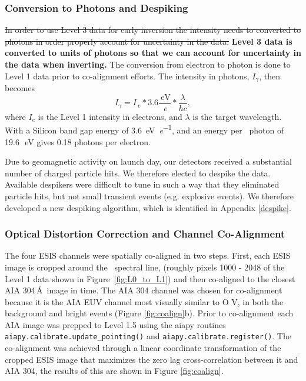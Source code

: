     
\subsubsection{Conversion to Photons and Despiking}
\sout{In order to use Level 3 data for early inversion the intensity needs to  converted to photons in order properly account for uncertainty in the data.}
\textbf{Level 3 data is converted to units of photons so that we can account for uncertainty in the data when inverting.}
The conversion from electron to photon is done to Level 1 data prior to co-alignment efforts.
The intensity in photons, $I_{\gamma}$, then becomes
\begin{equation}
  I_{\gamma} = I_{\SI{}{\elementarycharge}} * 3.6 \frac{\SI{}{\electronvolt}}{\SI{}{\elementarycharge}} * \frac{\lambda}{hc},
\end{equation}
where $I_e$ is the Level 1 intensity in electrons, and $\lambda$ is the target wavelength.
With a Silicon band gap energy of \SI[per-mode=symbol]{3.6}{\electronvolt\per\elementarycharge}, and an energy per \ov \ photon 
of 19.6\,\SI{}{\electronvolt} gives 0.18 photons per electron.


Due to geomagnetic activity on launch day, our detectors received a substantial number of charged particle hits. 
We therefore elected to despike the data.
Available despikers were difficult to tune in such a way that they eliminated particle hits, but not small transient events (e.g. explosive events). We therefore developed a new despiking algorithm, which is identified in Appendix \ref{despike}.

        
\subsubsection{Optical Distortion Correction and Channel Co-Alignment}
   
  The four ESIS channels were spatially co-aligned in two steps.
First, each ESIS image is cropped around the \ov \ spectral line, (roughly pixels 1000 - 2048 of the Level 1 data shown in Figure~\ref{fig:L0_to_L1}) and then co-aligned to the closest AIA 304\,\AA\ image in time.  
The AIA 304 channel was chosen for co-alignment because it is the AIA EUV channel most visually similar to O V, in both the background and bright events (Figure \ref{fig:coalign}b).
Prior to co-alignment each AIA image was prepped to Level 1.5 using the aiapy routines \texttt{aiapy.calibrate.update\_pointing()} and \texttt{aiapy.calibrate.register()}.
The co-alignment was achieved through a linear coordinate transformation of the cropped ESIS image that maximizes the zero lag cross-correlation between it and AIA 304, the results of this are shown in Figure \ref{fig:coalign}.

